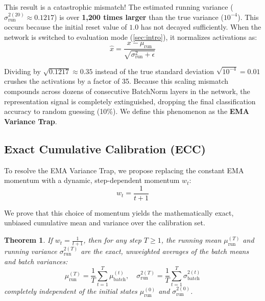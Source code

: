 \documentclass{article}
\theoremstyle{plain}
\newtheorem{theorem}{Theorem}[section]
\theoremstyle{definition}
\theoremstyle{remark}
\begin{document}
This result is a catastrophic mismatch! The estimated running variance ($\sigma^{2 (20)}_{\text{run}} \approx 0.1217$) is over \textbf{1,200 times larger} than the true variance ($10^{-4}$). This occurs because the initial reset value of $1.0$ has not decayed sufficiently. When the network is switched to evaluation mode (\cref{sec:intro}), it normalizes activations as:
\begin{equation}
    \hat{x} = \frac{x - \mu_{\text{run}}}{\sqrt{\sigma^2_{\text{run}} + \epsilon}}
\end{equation}

Dividing by $\sqrt{0.1217} \approx 0.35$ instead of the true standard deviation $\sqrt{10^{-4}} = 0.01$ crushes the activations by a factor of 35. Because this scaling mismatch compounds across dozens of consecutive BatchNorm layers in the network, the representation signal is completely extinguished, dropping the final classification accuracy to random guessing (10\%). We define this phenomenon as the \textbf{EMA Variance Trap}.

\subsection{Exact Cumulative Calibration (ECC)}
To resolve the EMA Variance Trap, we propose replacing the constant EMA momentum with a dynamic, step-dependent momentum $w_t$:
\begin{equation}
    w_t = \frac{1}{t+1}
\end{equation}

We prove that this choice of momentum yields the mathematically exact, unbiased cumulative mean and variance over the calibration set.

\begin{theorem}
If $w_t = \frac{1}{t+1}$, then for any step $T \ge 1$, the running mean $\mu_{\text{run}}^{(T)}$ and running variance $\sigma^{2 (T)}_{\text{run}}$ are the exact, unweighted averages of the batch means and batch variances:
\begin{equation}
    \mu_{\text{run}}^{(T)} = \frac{1}{T} \sum_{t=1}^T \mu_{\text{batch}}^{(t)}, \quad \sigma^{2 (T)}_{\text{run}} = \frac{1}{T} \sum_{t=1}^T \sigma^{2 (t)}_{\text{batch}}
\end{equation}
completely independent of the initial states $\mu_{\text{run}}^{(0)}$ and $\sigma^{2 (0)}_{\text{run}}$.
\end{theorem}
\end{document}
